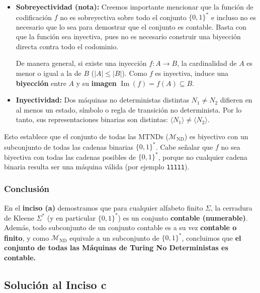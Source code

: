 \begin{itemize}
    \item \textbf{Sobreyectividad (nota):} Creemos importante mencionar que la función de codificación \(f\) no es sobreyectiva sobre todo el conjunto \(\{0, 1\}^*\) e incluso no es necesario que lo sea para demostrar que el conjunto es contable. Basta con que la función sea inyectiva, pues no es necesario construir una biyección directa contra todo el codominio.
    
    De manera general, si existe una inyección \(f: A \to B\), la cardinalidad de \(A\) es menor o igual a la de \(B\) (\(|A| \le |B|\)). Como \(f\) es inyectiva, induce una \textbf{biyección} entre \(A\) y su \textbf{imagen} \(\operatorname{Im}(f) = f(A) \subseteq B\).

    \item \textbf{Inyectividad:} Dos máquinas no deterministas distintas \(N_1 \neq N_2\) difieren en al menos un estado, símbolo o regla de transición no determinista. Por lo tanto, sus representaciones binarias son distintas: \(\langle N_1 \rangle \neq \langle N_2 \rangle\).
\end{itemize}

Esto establece que el conjunto de todas las MTNDs (\(\mathcal{M}_{\text{ND}}\)) es biyectivo con un subconjunto de todas las cadenas binarias \(\{0, 1\}^*\). Cabe señalar que \(f\) no sea biyectiva con todas las cadenas posibles de \(\{0, 1\}^*\), porque no cualquier cadena binaria resulta ser una máquina válida (por ejemplo \texttt{11111}).

\subsubsection*{Conclusión}
En el \textbf{inciso (a)} demostramos que para cualquier alfabeto finito \(\Sigma\), la cerradura de Kleene \(\Sigma^*\) (y en particular \(\{0, 1\}^*\)) es un conjunto \textbf{contable (numerable)}. Además, todo subconjunto de un conjunto contable es a su vez \textbf{contable o finito}, y como \(\mathcal{M}_{\text{ND}}\) equivale a un subconjunto de \(\{0, 1\}^*\), concluimos que \textbf{el conjunto de todas las Máquinas de Turing No Deterministas es contable.}

\subsection{Solución al Inciso c}

